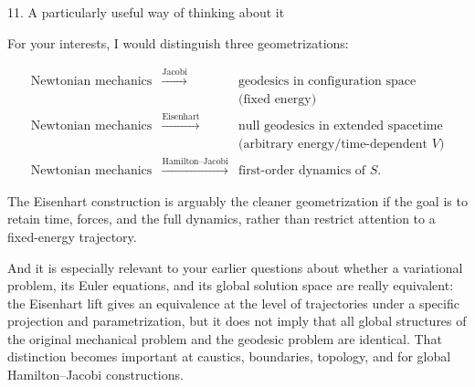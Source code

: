 11. A particularly useful way of thinking about it

For your interests, I would distinguish three geometrizations:

$$ \begin{array}{ccl} \text{Newtonian mechanics} &\xrightarrow{\text{Jacobi}}& \text{geodesics in configuration space} \\[3pt] &&\text{(fixed energy)} \\[10pt] \text{Newtonian mechanics} &\xrightarrow{\text{Eisenhart}}& \text{null geodesics in extended spacetime} \\[3pt] &&\text{(arbitrary energy/time-dependent }V\text{)} \\[10pt] \text{Newtonian mechanics} &\xrightarrow{\text{Hamilton--Jacobi}}& \text{first-order dynamics of }S. \end{array} $$

The Eisenhart construction is arguably the cleaner geometrization if the goal is to retain time, forces, and the full dynamics, rather than restrict attention to a fixed-energy trajectory.

And it is especially relevant to your earlier questions about whether a variational problem, its Euler equations, and its global solution space are really equivalent: the Eisenhart lift gives an equivalence at the level of trajectories under a specific projection and parametrization, but it does not imply that all global structures of the original mechanical problem and the geodesic problem are identical. That distinction becomes important at caustics, boundaries, topology, and for global Hamilton–Jacobi constructions.
